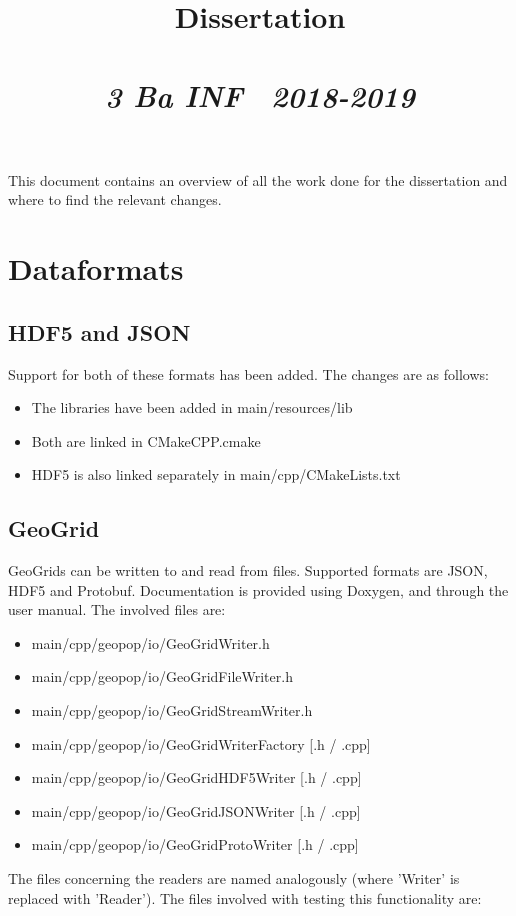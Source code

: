 \documentclass{article}
\title{\textmd{\textbf{Dissertation}}\\\normalsize\vspace{0.1in}\Large{\assignmentname}\\\vspace{0.1in}\small{\textit{3 Ba INF \  2018-2019}}}
\author{\studentA}
\date{}
\begin{document}
\maketitle

This document contains an overview of all the work done for the dissertation and where to find the relevant changes.

\section{Dataformats}
\subsection{HDF5 and JSON}
Support for both of these formats has been added. The changes are as follows:

\begin{itemize}
\item The libraries have been added in main/resources/lib
\item Both are linked in CMakeCPP.cmake
\item HDF5 is also linked separately in main/cpp/CMakeLists.txt
\end{itemize}

\subsection{GeoGrid}
GeoGrids can be written to and read from files. Supported formats are JSON, HDF5 and Protobuf. Documentation is provided using Doxygen, and through the user manual.
The involved files are:

\begin{itemize}
\item main/cpp/geopop/io/GeoGridWriter.h
\item main/cpp/geopop/io/GeoGridFileWriter.h
\item main/cpp/geopop/io/GeoGridStreamWriter.h
\item main/cpp/geopop/io/GeoGridWriterFactory [.h / .cpp]
\item main/cpp/geopop/io/GeoGridHDF5Writer [.h / .cpp]
\item main/cpp/geopop/io/GeoGridJSONWriter [.h / .cpp]
\item main/cpp/geopop/io/GeoGridProtoWriter [.h / .cpp]
\end{itemize}

The files concerning the readers are named analogously (where 'Writer' is replaced with 'Reader').
The files involved with testing this functionality are:
\end{document}
